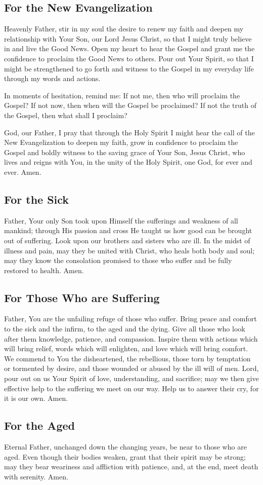 \documentclass[12pt]{article}
\newcommand{\prayertitle}[1]{\subsection{#1}}
\begin{document}
\prayertitle{For the New Evangelization}
\label{prayer:new_evangelization}
Heavenly Father, stir in my soul the desire to renew my faith and deepen my relationship with Your Son, our Lord Jesus Christ, so that I might truly believe in and live the Good News.   
Open my heart to hear the Gospel and grant me the confidence to proclaim the Good News to others.
Pour out Your Spirit, so that I might be strengthened to go forth and witness to the Gospel in my everyday life through my words and actions.  

In moments of hesitation, remind me:
If not me, then who will proclaim the Gospel?
If not now, then when will the Gospel be proclaimed?
If not the truth of the Gospel, then what shall I proclaim?

God, our Father, I pray that through the Holy Spirit I might hear the call of the New Evangelization to deepen my faith, grow in confidence to proclaim the Gospel and boldly witness to the saving grace of Your Son, Jesus Christ, who lives and reigns with You, in the unity of the Holy Spirit, one God, for ever and ever.
Amen.

\prayertitle{For the Sick}
Father, Your only Son took upon Himself the sufferings and weakness of all mankind; through His passion and cross He taught us how good can be brought out of suffering.
Look upon our brothers and sisters who are ill.
In the midst of illness and pain, may they be united with Christ, who heals both body and soul; may they know the consolation promised to those who suffer and be fully restored to health.
Amen.

\prayertitle{For Those Who are Suffering}
Father, You are the unfailing refuge of those who suffer.
Bring peace and comfort to the sick and the infirm, to the aged and the dying.
Give all those who look after them knowledge, patience, and compassion.
Inspire them with actions which will bring relief, words which will enlighten, and love which will bring comfort.
We commend to You the disheartened, the rebellious, those torn by temptation or tormented by desire, and those wounded or abused by the ill will of men.
Lord, pour out on us Your Spirit of love, understanding, and sacrifice; may we then give effective help to the suffering we meet on our way.
Help us to answer their cry, for it is our own.
Amen.

\prayertitle{For the Aged}
Eternal Father, unchanged down the changing years, be near to those who are aged.
Even though their bodies weaken, grant that their spirit may be strong; may they bear weariness and affliction with patience, and, at the end, meet death with serenity.
Amen.
\end{document}
